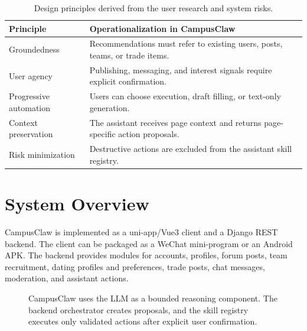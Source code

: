 \documentclass[sigconf]{acmart}
\begin{document}
\begin{table}[t]
\centering
\caption{Design principles derived from the user research and system risks.}
\label{tab:principles}
\begin{tabularx}{\linewidth}{lX}
\toprule
\textbf{Principle} & \textbf{Operationalization in CampusClaw}\\
\midrule
Groundedness & Recommendations must refer to existing users, posts, teams, or trade items.\\
User agency & Publishing, messaging, and interest signals require explicit confirmation.\\
Progressive automation & Users can choose execution, draft filling, or text-only generation.\\
Context preservation & The assistant receives page context and returns page-specific action proposals.\\
Risk minimization & Destructive actions are excluded from the assistant skill registry.\\
\bottomrule
\end{tabularx}
\end{table}

\section{System Overview}
CampusClaw is implemented as a uni-app/Vue3 client and a Django REST backend. The client can be packaged as a WeChat mini-program or an Android APK. The backend provides modules for accounts, profiles, forum posts, team recruitment, dating profiles and preferences, trade posts, chat messages, moderation, and assistant actions.

\begin{figure}[t]
\centering
{}
\caption{CampusClaw uses the LLM as a bounded reasoning component. The backend orchestrator creates proposals, and the skill registry executes only validated actions after explicit user confirmation.}
\label{fig:architecture}
\end{figure}
\end{document}
